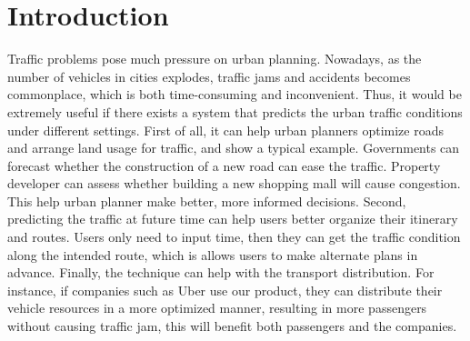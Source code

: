 \section{Introduction}
\label{sec:intro}
Traffic problems pose much pressure on urban planning. Nowadays, 
as the number of vehicles in cities explodes, traffic jams and 
accidents becomes commonplace, which is both time-consuming and inconvenient. 
Thus, it would be extremely useful if there exists a system that
predicts the urban traffic conditions under different settings. 
First of all, it can help urban planners optimize roads and arrange land usage for traffic,  and  show a typical example. Governments can forecast whether the construction of a new road 
can ease the traffic. Property developer can assess whether building a 
new shopping mall will cause congestion. This help urban planner make 
better, more informed decisions. Second, predicting the traffic at
future time can help users better organize their itinerary and routes. 
Users only need to input time, then they can get the traffic condition 
along the intended route, which is allows users to make alternate plans
in advance. Finally, the technique can help with the transport distribution. 
For instance, if companies such as Uber use our product, 
they can distribute their vehicle resources in a more optimized manner, 
resulting in more passengers without causing traffic jam, 
this will benefit both passengers and the companies.

